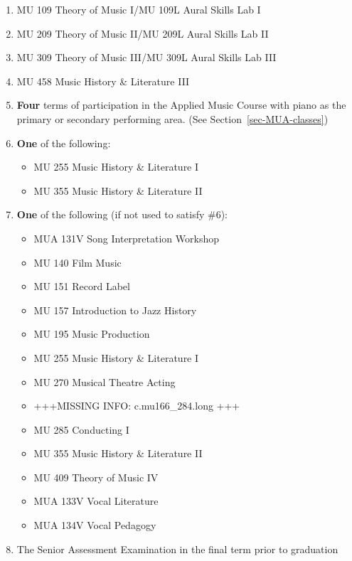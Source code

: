 \documentclass[
  letterpaper,
]{scrbook}
\providecommand{\tightlist}{%
  \setlength{\itemsep}{0pt}\setlength{\parskip}{0pt}}
\begin{document}
\begin{enumerate}
\def\labelenumi{\arabic{enumi}.}
\tightlist
\item
  MU 109 Theory of Music I/MU 109L Aural Skills Lab I
\item
  MU 209 Theory of Music II/MU 209L Aural Skills Lab II
\item
  MU 309 Theory of Music III/MU 309L Aural Skills Lab III
\item
  MU 458 Music History \& Literature III
\item
  \textbf{Four} terms of participation in the Applied Music Course with
  piano as the primary or secondary performing area. (See
  Section~\ref{sec-MUA-classes})
\item
  \textbf{One} of the following:

  \begin{itemize}
  \tightlist
  \item
    MU 255 Music History \& Literature I
  \item
    MU 355 Music History \& Literature II
  \end{itemize}
\item
  \textbf{One} of the following (if not used to satisfy \#6):

  \begin{itemize}
  \tightlist
  \item
    MUA 131V Song Interpretation Workshop
  \item
    MU 140 Film Music
  \item
    MU 151 Record Label
  \item
    MU 157 Introduction to Jazz History
  \item
    MU 195 Music Production
  \item
    MU 255 Music History \& Literature I
  \item
    MU 270 Musical Theatre Acting
  \item
    +++MISSING INFO: c.mu166\_284.long +++
  \item
    MU 285 Conducting I
  \item
    MU 355 Music History \& Literature II
  \item
    MU 409 Theory of Music IV
  \item
    MUA 133V Vocal Literature
  \item
    MUA 134V Vocal Pedagogy
  \end{itemize}
\item
  The Senior Assessment Examination in the final term prior to
  graduation
\end{enumerate}
\end{document}
